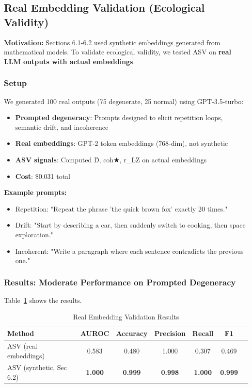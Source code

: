 \documentclass[11pt]{article}
\begin{document}
\subsection{Real Embedding Validation (Ecological Validity)}
\label{sec:eval-real-embeddings}

\textbf{Motivation:} Sections 6.1-6.2 used synthetic embeddings generated from mathematical models. To validate ecological validity, we tested ASV on \textbf{real LLM outputs with actual embeddings}.

\subsubsection{Setup}

We generated 100 real outputs (75 degenerate, 25 normal) using GPT-3.5-turbo:
\begin{itemize}
\item \textbf{Prompted degeneracy}: Prompts designed to elicit repetition loops, semantic drift, and incoherence
\item \textbf{Real embeddings}: GPT-2 token embeddings (768-dim), not synthetic
\item \textbf{ASV signals}: Computed D̂, coh★, r\_LZ on actual embeddings
\item \textbf{Cost}: \$0.031 total
\end{itemize}

\textbf{Example prompts:}
\begin{itemize}
\item Repetition: "Repeat the phrase 'the quick brown fox' exactly 20 times."
\item Drift: "Start by describing a car, then suddenly switch to cooking, then space exploration."
\item Incoherent: "Write a paragraph where each sentence contradicts the previous one."
\end{itemize}

\subsubsection{Results: Moderate Performance on Prompted Degeneracy}

Table~\ref{tab:real-embeddings} shows the results.

\begin{table}[h]
\centering
\caption{Real Embedding Validation Results}
\label{tab:real-embeddings}
\begin{tabular}{lcccccc}
\toprule
\textbf{Method} & \textbf{AUROC} & \textbf{Accuracy} & \textbf{Precision} & \textbf{Recall} & \textbf{F1} \\
\midrule
ASV (real embeddings) & 0.583 & 0.480 & 1.000 & 0.307 & 0.469 \\
ASV (synthetic, Sec 6.2) & \textbf{1.000} & \textbf{0.999} & \textbf{0.998} & \textbf{1.000} & \textbf{0.999} \\
\bottomrule
\end{tabular}
\end{table}
\end{document}
